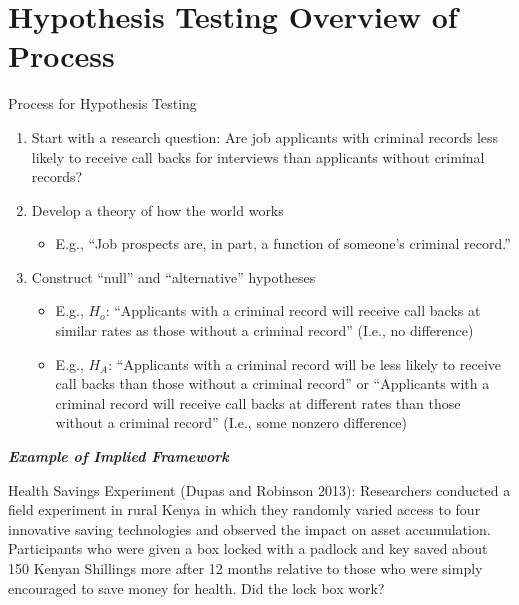 \documentclass[
  letterpaper,
  DIV=11,
  numbers=noendperiod]{scrreprt}
\providecommand{\tightlist}{%
  \setlength{\itemsep}{0pt}\setlength{\parskip}{0pt}}\usepackage{longtable,booktabs,array}
\begin{document}
\hypertarget{hypothesis-testing-overview-of-process}{%
\section{Hypothesis Testing Overview of
Process}\label{hypothesis-testing-overview-of-process}}

Process for Hypothesis Testing

\begin{enumerate}
\def\labelenumi{\arabic{enumi}.}
\tightlist
\item
  Start with a research question: Are job applicants with criminal
  records less likely to receive call backs for interviews than
  applicants without criminal records?
\item
  Develop a theory of how the world works

  \begin{itemize}
  \tightlist
  \item
    E.g., ``Job prospects are, in part, a function of someone's criminal
    record.''
  \end{itemize}
\item
  Construct ``null'' and ``alternative'' hypotheses

  \begin{itemize}
  \tightlist
  \item
    E.g., \(H_o\): ``Applicants with a criminal record will receive call
    backs at similar rates as those without a criminal record'' (I.e.,
    no difference)
  \item
    E.g., \(H_A\): ``Applicants with a criminal record will be less
    likely to receive call backs than those without a criminal record''
    or ``Applicants with a criminal record will receive call backs at
    different rates than those without a criminal record'' (I.e., some
    nonzero difference)
  \end{itemize}
\end{enumerate}

\textbf{\emph{Example of Implied Framework}}

Health Savings Experiment (Dupas and Robinson 2013): Researchers
conducted a field experiment in rural Kenya in which they randomly
varied access to four innovative saving technologies and observed the
impact on asset accumulation. Participants who were given a box locked
with a padlock and key saved about 150 Kenyan Shillings more after 12
months relative to those who were simply encouraged to save money for
health. Did the lock box work?
\end{document}
